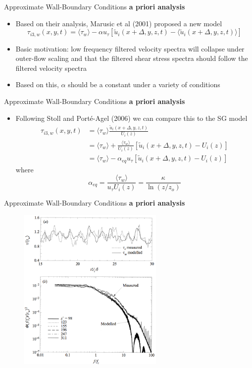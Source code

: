 \begin{frame}{Approximate Wall-Boundary Conditions}
\textbf{a priori analysis}
\begin{itemize}
	\item Based on their analysis, Marusic et al (2001) proposed a new model
	$$\tau_{i3,w}(x,y,t) = \langle \tau_w \rangle - \alpha u_\tau \left[ \tilde{u}_i (x + \Delta,y,z,t) - \langle \tilde{u}_i (x+\Delta,y,z,t)\rangle \right]$$
	\item Basic motivation: low frequency filtered velocity spectra will collapse under outer-flow scaling and that the filtered shear stress spectra should follow the filtered velocity spectra
	\item Based on this, $\alpha$ should be a constant under a variety of conditions
\end{itemize}
\end{frame}
\begin{frame}{Approximate Wall-Boundary Conditions}
\textbf{a priori analysis}
\begin{itemize}
	\item Following Stoll and Port\'{e}-Agel (2006) we can compare
this to the SG model
	\begin{align*}
	\tau_{i3,w}(x,y,t) &= \langle \tau_w \rangle \frac{\tilde{u}_i (x + \Delta,y,z,t)}{U_i(z)}\\
	&= \langle \tau_w \rangle + \frac{\langle \tau_w \rangle}{U_i(z)} \left[ \tilde{u}_i(x+\Delta,y,z,t) - U_i(z)\right]\\
	&= \langle \tau_w \rangle - \alpha_{eq} u_\tau \left[ \tilde{u}_i(x+\Delta,y,z,t) - U_i(z)\right]
	\end{align*}
	where
	$$\alpha_{eq} = \frac{\langle \tau_w \rangle}{u_\tau U_i(z)} = \frac{\kappa}{\ln(z/z_o)}$$
\end{itemize}
\end{frame}
\begin{frame}{Approximate Wall-Boundary Conditions}
\textbf{a priori analysis}
\begin{figure}
      \includegraphics[width=0.63\textwidth]{sbc7}
\end{figure}
\end{frame}
